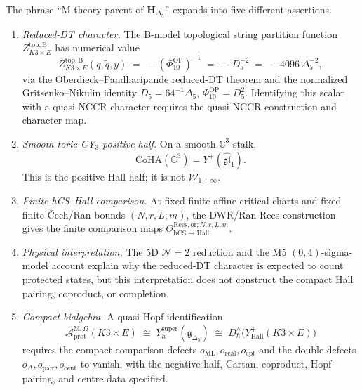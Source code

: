 \begin{theorem}
\label{thm:k3-chiral-bialgebra-m-theory-parent-stratified}
The phrase ``M-theory parent of \(\mathbf H_{\Delta_5}\)'' expands into
five different assertions.
\begin{enumerate}[label=\textup{(\roman*)}]
\item \emph{Reduced-DT character.} The B-model topological string
partition function \(Z^{\mathrm{top, B}}_{K3 \times E}\) has numerical
value
\[
 Z^{\mathrm{top, B}}_{K3 \times E}(q, \tilde q, y)
 \;=\;
 -(\Phi_{10}^{\mathrm{OP}})^{-1}
 \;=\;
 -D_5^{-2}
 \;=\;
 -4096\,\Delta_5^{-2},
\]
via the Oberdieck--Pandharipande reduced-DT theorem and the
normalized Gritsenko--Nikulin identity
\(D_5=64^{-1}\Delta_5\), \(\Phi_{10}^{\mathrm{OP}}=D_5^2\).
Identifying this scalar with a quasi-NCCR character requires the
quasi-NCCR construction and character map.
\item \emph{Smooth toric CY$_3$ positive half.} On a smooth
\(\mathbb C^3\)-stalk,
\[
 \mathrm{CoHA}(\mathbb C^3)=Y^+(\widehat{\mathfrak{gl}}_1).
\]
This is the positive Hall half; it is not \(\mathcal W_{1+\infty}\).
\item \emph{Finite hCS--Hall comparison.} At fixed finite affine
critical charts and fixed finite \v{C}ech/Ran bounds \((N,r,L,m)\), the
DWR/Ran Rees construction gives the finite comparison maps
\(\Theta_{\mathrm{hCS}\to\mathrm{Hall}}^{\mathrm{Rees,or};N,r,L,m}\).
\item \emph{Physical interpretation.} The 5D \(\mathcal N=2\) reduction
and the M5 \((0,4)\)-sigma-model account explain why the reduced-DT
character is expected to count protected states, but this interpretation
does not construct the compact Hall pairing, coproduct, or completion.
\item \emph{Compact bialgebra.} A quasi-Hopf
identification
\[
 \mathcal A^{\mathrm{M},\Omega}_{\mathrm{prot}}(K3\times E)
 \;\cong\;
 Y_\hbar^{\mathrm{super}}(\mathfrak g_{\Delta_5})
 \;\cong\;
 D^\wedge_\hbar\!\bigl(Y^+_{\mathrm{Hall}}(K3\times E)\bigr)
\]
requires the compact comparison defects
\(o_{\mathrm{ML}},o_{\mathrm{real}},o_{\mathrm{cpt}}\) and the double
defects \(o_{\Delta},o_{\mathrm{pair}},o_{\mathrm{cent}}\) to vanish,
with the negative half, Cartan, coproduct, Hopf pairing, and centre data
specified.
\end{enumerate}
\end{theorem}

